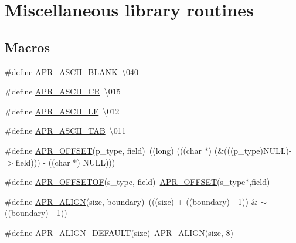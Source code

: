 \hypertarget{group__apr__general}{}\section{Miscellaneous library routines}
\label{group__apr__general}
\subsection*{Macros}
\begin{DoxyCompactItemize}
\item 
\#define \hyperlink{group__apr__general_ga60fc208d93123acc7cf915a66e49e654}{A\+P\+R\+\_\+\+A\+S\+C\+I\+I\+\_\+\+B\+L\+A\+NK}~\textquotesingle{}\textbackslash{}040\textquotesingle{}
\item 
\#define \hyperlink{group__apr__general_ga91c14ef7f03e82c07f4d3d56f63f8b6a}{A\+P\+R\+\_\+\+A\+S\+C\+I\+I\+\_\+\+CR}~\textquotesingle{}\textbackslash{}015\textquotesingle{}
\item 
\#define \hyperlink{group__apr__general_ga9e76601cef56a7a5b25f73fe6d57d7d9}{A\+P\+R\+\_\+\+A\+S\+C\+I\+I\+\_\+\+LF}~\textquotesingle{}\textbackslash{}012\textquotesingle{}
\item 
\#define \hyperlink{group__apr__general_gac7162c0b5d026a0717aaa98bf581349d}{A\+P\+R\+\_\+\+A\+S\+C\+I\+I\+\_\+\+T\+AB}~\textquotesingle{}\textbackslash{}011\textquotesingle{}
\item 
\#define \hyperlink{group__apr__general_ga41e537d6ad732766d12cd4eb61531678}{A\+P\+R\+\_\+\+O\+F\+F\+S\+ET}(p\+\_\+type,  field)~((long) (((char $\ast$) (\&(((p\+\_\+type)N\+U\+LL)-\/$>$field))) -\/ ((char $\ast$) N\+U\+LL)))
\item 
\#define \hyperlink{group__apr__general_gac16b1187b6ea63706c5dd48c88323dec}{A\+P\+R\+\_\+\+O\+F\+F\+S\+E\+T\+OF}(s\+\_\+type,  field)~\hyperlink{group__apr__general_ga41e537d6ad732766d12cd4eb61531678}{A\+P\+R\+\_\+\+O\+F\+F\+S\+ET}(s\+\_\+type$\ast$,field)
\item 
\#define \hyperlink{group__apr__general_ga3c4f50d14ebe7a6add282d879521d552}{A\+P\+R\+\_\+\+A\+L\+I\+GN}(size,  boundary)~(((size) + ((boundary) -\/ 1)) \& $\sim$((boundary) -\/ 1))
\item 
\#define \hyperlink{group__apr__general_gab484e98426221f3212fcb67af0467381}{A\+P\+R\+\_\+\+A\+L\+I\+G\+N\+\_\+\+D\+E\+F\+A\+U\+LT}(size)~\hyperlink{group__apr__general_ga3c4f50d14ebe7a6add282d879521d552}{A\+P\+R\+\_\+\+A\+L\+I\+GN}(size, 8)
\end{DoxyCompactItemize}
